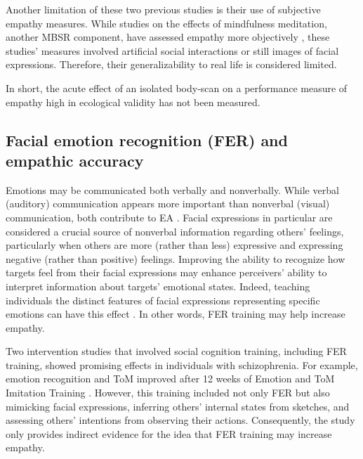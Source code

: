 \documentclass[authordate, empirical, issue]{jote-new-article}
\begin{document}
Another limitation of these two previous studies is their use of subjective empathy measures. While studies on the effects of mindfulness meditation, another MBSR component, have assessed empathy more objectively \parencites[e.g.,][]{Mascaro2013}, these studies' measures involved artificial social interactions or still images of facial expressions. Therefore, their generalizability to real life is considered limited.



In short, the acute effect of an isolated body-scan on a performance measure of empathy high in ecological validity has not been measured.



\subsection{Facial emotion recognition (FER) and empathic accuracy}



Emotions may be communicated both verbally and nonverbally. While verbal (auditory) communication appears more important than nonverbal (visual) communication, both contribute to EA \parencites{Zaki2009}. Facial expressions in particular are considered a crucial source of nonverbal information regarding others' feelings, particularly when others are more (rather than less) expressive and expressing negative (rather than positive) feelings. Improving the ability to recognize how targets feel from their facial expressions may enhance perceivers' ability to interpret information about targets' emotional states. Indeed, teaching individuals the distinct features of facial expressions representing specific emotions can have this effect \parencites{Beitel2005}. In other words, FER training may help increase empathy.



Two intervention studies that involved social cognition training, including FER training, showed promising effects in individuals with schizophrenia. For example, emotion recognition and ToM improved after 12 weeks of Emotion and ToM Imitation Training \parencites{Mazza2010}. However, this training included not only FER but also mimicking facial expressions, inferring others' internal states from sketches, and assessing others' intentions from observing their actions. Consequently, the study only provides indirect evidence for the idea that FER training may increase empathy.
\end{document}
